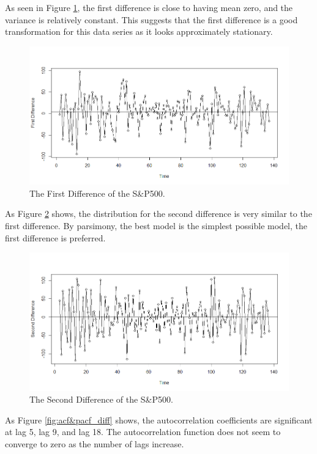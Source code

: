 \documentclass[12pt, centerh1]{article}
\begin{document}
As seen in Figure \ref{fig:first_difference}, the first difference is close to having mean zero, and the variance is relatively constant. This suggests that the first difference is a good transformation for this data series as it looks approximately stationary. 

\begin{figure}[H]
    \centering
    \includegraphics[scale=0.5]{imgs/first_difference.png}
    \caption{The First Difference of the S\&P500.}
    \label{fig:first_difference}
\end{figure}

As Figure \ref{fig:second_difference} shows, the distribution for the second difference is very similar to the first difference. By parsimony, the best model is the simplest possible model, the first difference is preferred.

\begin{figure}[H]
    \centering
    \includegraphics[scale=0.5]{imgs/second_difference.png}
    \caption{The Second Difference of the S\&P500.}
    \label{fig:second_difference}
\end{figure}

As Figure \ref{fig:acf&pacf_diff} shows, the autocorrelation coefficients are significant at lag 5, lag 9, and lag 18. The autocorrelation function does not seem to converge to zero as the number of lags increase. 
\end{document}
